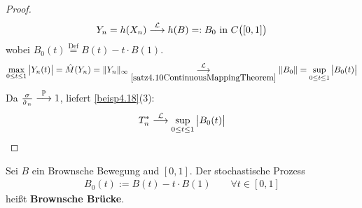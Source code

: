 \begin{proof}
\begin{align*}
Y_n=h(X_n)\stackrel{\L}{\longrightarrow} h(B)=:B_0\text{ in }C\big([0,1]\big)
\end{align*}
wobei $B_0(t)\overset{\text{Def}}{=}B(t)-t\cdot B(1)$.
\begin{align*}
\max\limits_{0\leq t\leq 1}\big|Y_n(t)\big|=\hat{M}(Y_n)=\Vert Y_n\Vert_\infty\stackrelnew{\ref{satz4.10ContinuousMappingTheorem}}{\L}{\longrightarrow}\Vert B_0\Vert=\sup\limits_{0\leq t\leq 1}\big|B_0(t)\big|
\end{align*}
Da $\frac{\sigma}{\hat{\sigma}_n}\stackrel{\P}{\longrightarrow}1$, liefert \ref{beisp4.18}(3):
\begin{align*}
T_n^\ast\stackrel{\L}{\longrightarrow}\sup\limits_{0\leq t\leq 1}\big|B_0(t)\big|
\end{align*}
\end{proof}

\begin{definition} %
Sei $B$ ein Brownsche Bewegung aud $[0,1]$. Der stochastische Prozess
\begin{align*}
B_0(t):=B(t)-t\cdot B(1)\qquad\forall t\in[0,1]
\end{align*}
heißt \textbf{Brownsche Brücke}.
\end{definition}



